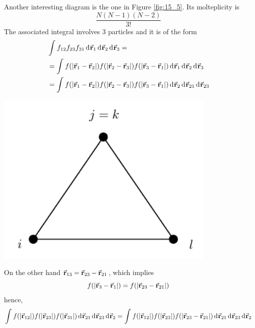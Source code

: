 \documentclass[../main/main.tex]{subfiles}
\begin{document}
\begin{minipage}[c]{0.7\linewidth}
Another interesting diagram is the one in Figure \ref{fig:15_5}. Its molteplicity is
\begin{equation}
  \frac{N(N-1)(N-2)}{3!}
\end{equation}
The associated integral involves 3 particles and it is of the form
\begin{equation}
\begin{split}
   & \int_{}^{} f_{12} f_{23} f_{31} \dd[]{\va{r}_1}  \dd[]{\va{r}_2} \dd[]{\va{r}_3} = \\
   & = \int_{}^{} f ( \abs{\va{r}_1 - \va{r}_2} ) f ( \abs{\va{r}_2 - \va{r}_3} )  f ( \abs{\va{r}_3 - \va{r}_1} )  \dd[]{\va{r}_1} \dd[]{\va{r}_2} \dd[]{\va{r}_3} \\
   & = \int_{}^{} f ( \abs{\va{r}_1 - \va{r}_2} ) f ( \abs{\va{r}_2 - \va{r}_3} )  f ( \abs{\va{r}_3 - \va{r}_1} )  \dd[]{\va{r}_2} \dd[]{\va{r}_{21}} \dd[]{\va{r}_{23}}
\end{split}
\end{equation}
\end{minipage}
\begin{minipage}[]{0.3\linewidth}
\centering
\includegraphics[width=0.8\textwidth]{../lessons/15_image/8.pdf}
\end{minipage}
On the other hand \( \va{r}_{13} = \va{r}_{23} - \va{r}_{21} \), which implies
\begin{equation}
   f ( \abs{\va{r}_3 - \va{r}_1} )  =  f ( \abs{\va{r}_{23} - \va{r}_{21}} )
\end{equation}
hence,
\begin{equation}
  \int_{}^{} f (\abs{\va{r}_{12}} ) f (\abs{\va{r}_{23}} ) f (\abs{\va{r}_{31}} ) \dd[]{\va{r}_{21}}  \dd[]{\va{r}_{23}}  \dd[]{\va{r}_{2}}
  =
    \int_{}^{} f (\abs{\va{r}_{12}} ) f (\abs{\va{r}_{23}} ) f (\abs{\va{r}_{23}-\va{r}_{21}} )  \dd[]{\va{r}_{21}}  \dd[]{\va{r}_{23}}  \dd[]{\va{r}_{2}}
\end{equation}
\end{document}
